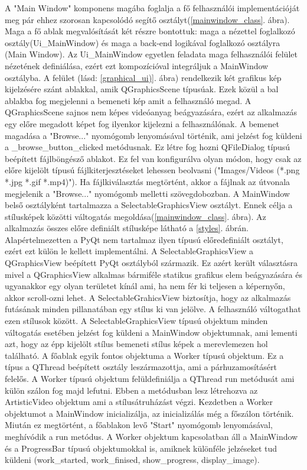 \documentclass[12pt, a4paper, oneside]{book}
\theoremstyle{tetel}
\begin{document}
A "Main Window" komponens magába foglalja a fő felhasználói implementációját meg pár ehhez szorosan kapcsolódó segítő osztályt(\ref{mainwindow_class}. ábra). Maga a fő ablak megvalósítását két részre bontottuk: maga a nézettel foglalkozó osztály(Ui\_MainWindow) és maga a back-end logikával foglalkozó osztályra (Main Window). Az Ui\_MainWindow egyetlen feladata maga felhasználói felület nézetének definiálása, ezért ezt kompozícióval integráljuk a MainWindow osztályba. A felület (lásd: \ref{graphical_ui)}. ábra) rendelkezik két grafikus kép kijelzésére szánt ablakkal, amik QGraphicsScene típusúak. Ezek közül a bal ablakba fog megjelenni a bemeneti kép amit a felhasználó megad. A QGraphicsScene sajnos nem képes videóanyag beágyazására, ezért az alkalmazás egy előre megadott képet fog ilyenkor kijelezni a felhasználónak. 
\newline
\indent
A bemenet magadása a "Browse..." nyomógomb lenyomásával történik, ami jelzést fog küldeni a \_browse\_button\_clicked metódusnak. Ez létre fog hozni QFileDialog típusú beépített fájlböngésző ablakot. Ez fel van konfigurálva olyan módon, hogy csak az előre kijelölt típusú fájlkiterjesztéseket lehessen beolvasni ("Images/Videos (*.png *.jpg *.gif *.mp4)"). Ha fájlkiválasztás megtörtént, akkor a fájlnak az útvonala megjelenik a "Browse..." nyomógomb melletti szövegdobozban.
\newline
\indent
A MainWindow belső osztályként tartalmazza a SelectableGraphicsView osztályt. Ennek célja a stílusképek közötti váltogatás megoldása(\ref{mainwindow_class}. ábra). Az alkalmazás összes előre definiált stílusképe látható a \ref{styles}. ábrán. Alapértelmezetten a PyQt nem tartalmaz ilyen típusú előredefiniált osztályt, ezért ezt külön le kellett implementálni. A SelectableGraphicsView a QGraphicsView beépített PyQt osztályból származik. Ez azért került választásra mivel a QGraphicsView alkalmas bármiféle statikus grafikus elem beágyazására és ugyanakkor egy olyan területet kínál ami, ha nem fér ki teljesen a képernyőn, akkor scroll-ozni lehet. A SelectableGrahicsView biztosítja, hogy az alkalmazás futásának minden pillanatában egy stílus ki van jelölve. A felhasználó váltogathat ezen stílusok között. A SelectableGraphicsView típusú objektum minden váltogatás esetében jelzést fog küldeni a MainWindow objektumnak, ami lementi azt, hogy az épp kijelölt stílus bemeneti stílus képek a merevlemezen hol található.
\newline
\indent
A főablak egyik fontos objektuma a Worker típusú objektum. Ez a típus a QThread beépített osztály leszármazottja, ami a párhuzamosításért felelős. A Worker típusú objektum felüldefiniálja a QThread run metódusát ami külön szálon fog majd lefutni. Ebben a metódusban lesz létrehozva az ArtisticVideo objektum ami a stílusátruházást végzi. Kezdetben a Worker objektumot a MainWindow inicializálja, az inicializálás még a főszálon történik. Miután ez megtörtént, a főablakon levő "Start" nyomógomb lenyomásával, meghívódik a run metódus. A Worker objektum kapcsolatban áll a MainWindow és a ProgressBar típusú objektumokkal is, amiknek különféle jelzéseket tud küldeni (work\_started, work\_finised, show\_progress, display\_image).
\end{document}
